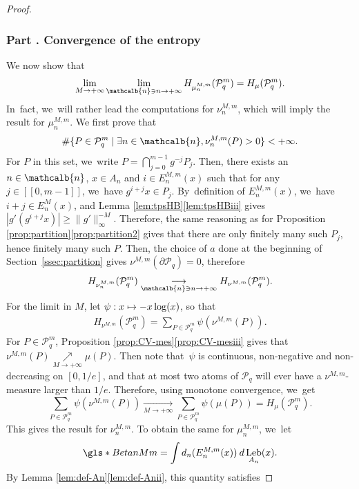 \documentclass[10pt]{amsart}
\renewcommand{\thesubsubsection}{\arabic{subsubsection}}
\newcommand\mto{\mathchoice{\longmapsto}{\mapsto}{\mapsto}{\mapsto}}
\DeclareMathOperator{\Leb}{Leb}
\newcommand{\mcbn}{{\mathcalb{n}}}
\theoremstyle{definition}
\begin{document}
\begin{proof}
\label{part2}
\subsubsection*{Part \thesubsubsection. Convergence of the entropy}

We now show that
\[
\lim_{M \to +\infty} \lim_{\mcbn \ni n \to +\infty} H_{\mu_n^{M,m}}(\mathcal{P}_q^{m}) = H_{\mu}(\mathcal{P}_q^m).
\]
In~fact, we~will rather lead the computations for $\nu_n^{M,m}$, which will imply the result for $\mu_n^{M,m}$.
We first prove that
\[
\# \{ P \in \mathcal{P}_q^{m} \mid \exists n \in \mcbn, \nu_n^{M,m}(P) > 0 \} < +\infty.
\]
For $P$ in this set, we~write $P = \bigcap_{j = 0}^{m-1} g^{-j} P_j$.
Then, there exists an $n \in \mcbn$, $x \in A_n$ and $i \in E_n^{M,m}(x)$ such that for any $j \in [\![ 0, m-1 ]\!]$, we~have $g^{i+j} x \in P_j$. By~definition of $E_n^{M,m}(x)$, we~have $i+j \in E_n^M(x)$, and Lemma \ref{lem:tpsHB}\eqref{lem:tpsHBiii} gives
$|g'(g^{i+j} x)| \geq \| g' \|_{\infty}^{-M}$.
Therefore, the same reasoning as for Proposition \ref{prop:partition}\eqref{prop:partition2} gives that there are only finitely many such $P_j$, hence finitely many such $P$.
Then, the choice of $a$ done at the beginning of Section~\ref{ssec:partition} gives $\nu^{M,m}(\partial \mathcal{P}_q) = 0$, therefore
\[
H_{\nu_n^{M,m}}(\mathcal{P}_q^{m}) \underset{\mcbn \ni n \to +\infty}{\longrightarrow} H_{\nu^{M,m}}(\mathcal{P}_q^m).
\]
For the limit in $M$, let $\psi : x \mto - x \log(x)$, so that
\begin{align*}
H_{\nu^{M,m}}(\mathcal{P}_q^{m})
= \sum_{P \in \mathcal{P}_q^{m}} \psi(\nu^{M,m}(P)).
\end{align*}
For $P \in \mathcal{P}_q^m$, Proposition \ref{prop:CV-mes}\eqref{prop:CV-mesiii} gives that $\nu^{M,m}(P) \!\underset{M \to +\infty}{\nearrow}\! \mu(P)$.
Then note that~$\psi$ is continuous, non-negative and non-decreasing on $[0, 1/e]$, and that at most two atoms of $\mathcal{P}_q$ will ever have a $\nu^{M,m}$-measure larger than $1/e$.
Therefore, using monotone convergence, we~get\vspace*{-3pt}
\[
\sum_{P \in \mathcal{P}_q^{m}} \psi(\nu^{M,m}(P)) \underset{M \to +\infty}{\longrightarrow} \sum_{P \in \mathcal{P}_q^{m}} \psi(\mu(P))
= H_{\mu}(\mathcal{P}_q^m).
\]
This gives the result for $\nu_n^{M,m}$. To obtain the same for $\mu_n^{M,m}$, we~let
\[
\gls*{BetanMm} = \int d_n(E_n^{M,m}(x)) \: d \Leb_{A_n}(x).
\]
By Lemma \ref{lem:def-An}\eqref{lem:def-Anii}, this quantity satisfies\vspace*{-3pt}

\end{proof}
\end{document}
